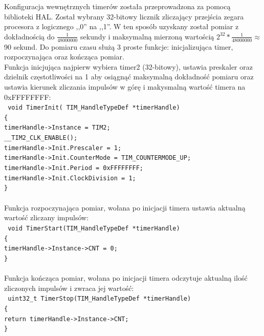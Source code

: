 \documentclass[oneside]{mgr}
\begin{document}
Konfiguracja wewnętrznych timerów została przeprowadzona za pomocą biblioteki HAL. Został wybrany 32-bitowy licznik zliczający przejścia zegara procesora z logicznego ,,0'' na ,,1''. W ten sposób uzyskany został pomiar z dokładnością do $\frac{1}{48000000}$ sekundy i maksymalną mierzoną wartością $2^{32} * \frac{1}{48000000} \approx$ 90 sekund. Do pomiaru czasu służą 3 proste funkcje: inicjalizująca timer, rozpoczynająca oraz kończąca pomiar.
\\Funkcja inicjująca najpierw wybiera timer2 (32-bitowy), ustawia preskaler oraz dzielnik częstotliwości na 1 aby osiągnąć maksymalną dokładność pomiaru oraz ustawia kierunek zliczania impulsów w górę i makysmalną wartość timera na 0xFFFFFFFF:\\
\texttt{
void TimerInit( TIM\_HandleTypeDef *timerHandle)\\
\{\\
\hspace*{10mm}timerHandle->Instance = TIM2;\\
\hspace*{10mm}\_\_TIM2\_CLK\_ENABLE();\\
\hspace*{10mm}timerHandle->Init.Prescaler = 1;\\
\hspace*{10mm}timerHandle->Init.CounterMode = TIM\_COUNTERMODE\_UP;\\
\hspace*{10mm}timerHandle->Init.Period = 0xFFFFFFFF;\\
\hspace*{10mm}timerHandle->Init.ClockDivision = 1;\\\}\\
}
\\Funkcja rozpoczynająca pomiar, wołana po inicjacji timera ustawia aktualną wartość zliczany impulsów:\\
\texttt{
void TimerStart(TIM\_HandleTypeDef *timerHandle)\\
\{\\
\hspace*{10mm}timerHandle->Instance->CNT = 0;\\
\}\\
}
\\Funkcja kończąca pomiar, wołana po inicjacji timera odczytuje aktualną ilość zliczonych impulsów i zwraca jej wartość:\\
\texttt{
uint32\_t TimerStop(TIM\_HandleTypeDef *timerHandle)\\
\{\\
\hspace*{10mm}return timerHandle->Instance->CNT;\\
\}
}
\end{document}
